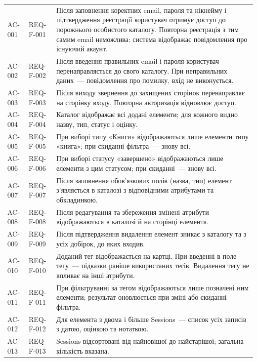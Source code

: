 \begin{longtable}{L{2cm} L{2.5cm} L{9.5cm}}
AC-001 & REQ-F-001 & Після заповнення коректних email, пароля та нікнейму і підтвердження реєстрації користувач отримує доступ до порожнього особистого каталогу. Повторна реєстрація з тим самим email неможлива: система відображає повідомлення про існуючий акаунт.  \\
\addlinespace
AC-002 & REQ-F-002 & Після введення правильних email і пароля користувач перенаправляється до свого каталогу. При неправильних даних~--- повідомлення про помилку, вхід не виконується.  \\
\addlinespace
AC-003 & REQ-F-003 & Після виходу звернення до захищених сторінок перенаправляє на сторінку входу. Повторна авторизація відновлює доступ.  \\
\addlinespace
AC-004 & REQ-F-004 & Каталог відображає всі додані елементи; для кожного видно назву, тип, статус і оцінку.  \\
\addlinespace
AC-005 & REQ-F-005 & При виборі типу «Книги» відображаються лише елементи типу «книга»; при скиданні фільтра~--- знову всі.  \\
\addlinespace
AC-006 & REQ-F-006 & При виборі статусу «завершено» відображаються лише елементи з цим статусом; при скиданні~--- знову всі.  \\
\addlinespace
AC-007 & REQ-F-007 & Після заповнення обов'язкових полів (назва, тип) елемент з'являється в каталозі з відповідними атрибутами та обкладинкою.  \\
\addlinespace
AC-008 & REQ-F-008 & Після редагування та збереження змінені атрибути відображаються в каталозі й на сторінці елемента.  \\
\addlinespace
AC-009 & REQ-F-009 & Після підтвердження видалення елемент зникає з каталогу та з усіх добірок, до яких входив.  \\
\addlinespace
AC-010 & REQ-F-010 & Доданий тег відображається на картці. При введенні в поле тегу~--- підказки раніше використаних тегів. Видалення тегу не впливає на інші атрибути.  \\
\addlinespace
AC-011 & REQ-F-011 & При фільтруванні за тегом відображаються лише позначені ним елементи; результат оновлюється при зміні або скиданні фільтра.  \\
\addlinespace
AC-012 & REQ-F-012 & Для елемента з двома і більше Sessions~--- список усіх записів з датою, оцінкою та нотаткою.  \\
\addlinespace
AC-013 & REQ-F-013 & Sessions відсортовані від найновішої до найстарішої; загальна кількість вказана.  \\

\end{longtable}
